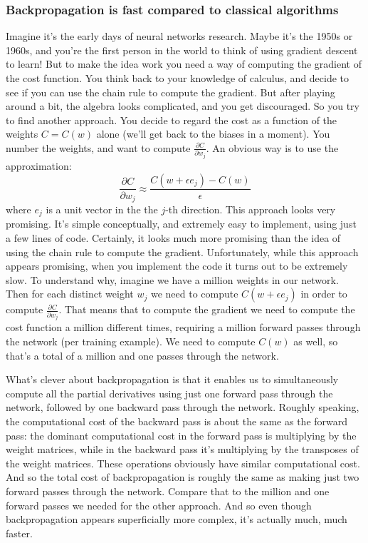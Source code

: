\documentclass[12pt, letterpaper]{article}
\theoremstyle{definition}
\begin{document}
\subsubsection{Backpropagation is fast compared to classical algorithms}
Imagine it's the early days of neural networks research. Maybe it's the 1950s or 1960s, and you're the first person in the world to think of using gradient descent to learn! But to make the idea work you need a way of computing the gradient of the cost function. You think back to your knowledge of calculus, and decide to see if you can use the chain rule to compute the gradient. But after playing around a bit, the algebra looks complicated, and you get discouraged. So you try to find another approach. You decide to regard the cost as a function of the weights $C=C(w)$ alone (we'll get back to the biases in a moment). You number the weights, and want to compute $\frac{\partial C}{\partial w_j}$. An obvious way is to use the approximation:
\begin{equation*}
\frac{\partial C}{\partial w_j} \approx \frac{C(w+\epsilon e_j) - C(w)}{\epsilon}
\end{equation*}
where $e_j$ is a unit vector in the the $j$-th direction. This approach looks very promising. It's simple conceptually, and extremely easy to implement, using just a few lines of code. Certainly, it looks much more promising than the idea of using the chain rule to compute the gradient. Unfortunately, while this approach appears promising, when you implement the code it turns out to be extremely slow. To understand why, imagine we have a million weights in our network. Then for each distinct weight $w_j$ we need to compute $C(w+\epsilon e_j)$ in order to compute $\frac{\partial C}{\partial w_j}$. That means that to compute the gradient we need to compute the cost function a million different times, requiring a million forward passes through the network (per training example). We need to compute $C(w)$ as well, so that's a total of a million and one passes through the network.

What's clever about backpropagation is that it enables us to simultaneously compute all the partial derivatives using just one forward pass through the network, followed by one backward pass through the network. Roughly speaking, the computational cost of the backward pass is about the same as the forward pass: the dominant computational cost in the forward pass is multiplying by the weight matrices, while in the backward pass it's multiplying by the transposes of the weight matrices. These operations obviously have similar computational cost. And so the total cost of backpropagation is roughly the same as making just two forward passes through the network. Compare that to the million and one forward passes we needed for the other approach. And so even though backpropagation appears superficially more complex, it's actually much, much faster.
\end{document}
